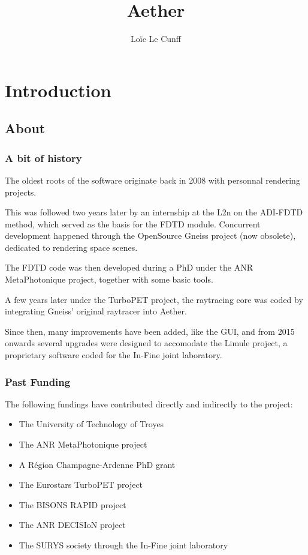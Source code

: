 \documentclass[a4paper,11pt]{book}
\title{Aether}
\author{Loïc Le Cunff}
\begin{document}

\maketitle

\tableofcontents


\part{Introduction}

\chapter{About}

\section{A bit of history}

The oldest roots of the software originate back in 2008 with personnal rendering projects.

This was followed two years later by an internship at the L2n on the ADI-FDTD method, which served as the basis for the FDTD module. Concurrent development happened through the OpenSource Gneiss project (now obsolete), dedicated to rendering space scenes.

The FDTD code was then developed during a PhD under the ANR MetaPhotonique project, together with some basic tools.

A few years later under the TurboPET project, the raytracing core was coded by integrating Gneiss' original raytracer into Aether.

Since then, many improvements have been added, like the GUI, and from 2015 onwards several upgrades were designed to accomodate the Limule project, a proprietary software coded for the In-Fine joint laboratory.

\section{Past Funding}

The following fundings have contributed directly and indirectly to the project:
\begin{itemize}
	\item The University of Technology of Troyes
	\item The ANR MetaPhotonique project
	\item A Région Champagne-Ardenne PhD grant
	\item The Eurostars TurboPET project
	\item The BISONS RAPID project
	\item The ANR DECISIoN project
	\item The SURYS society through the In-Fine joint laboratory
\end{itemize}
\end{document}
